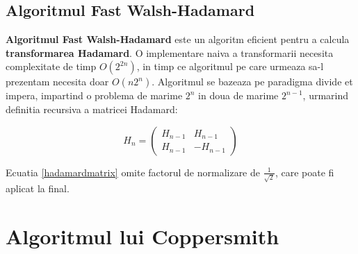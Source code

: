 \subsection{Algoritmul Fast Walsh-Hadamard}

\textbf{Algoritmul Fast Walsh-Hadamard} este un algoritm eficient pentru a
calcula \textbf{transformarea Hadamard}. O implementare naiva a transformarii
necesita complexitate de timp $O(2^{2n})$, in timp ce algoritmul pe care urmeaza
sa-l prezentam necesita doar $O(n2^{n})$. Algoritmul se bazeaza pe paradigma
divide et impera, impartind o problema de marime $2^{n}$ in doua de marime
$2^{n-1}$, urmarind definitia recursiva a matricei Hadamard:

\begin{equation}
  \label{hadamardmatrix}
  H_{n} =
  \begin{pmatrix}
    H_{n-1} & H_{n-1}\\
    H_{n-1} & -H_{n-1}
  \end{pmatrix}
\end{equation}

Ecuatia \ref{hadamardmatrix} omite factorul de normalizare de
$\frac{1}{\sqrt{2}}$, care poate fi aplicat la final.

\begin{algorithm}[H]
  \DontPrintSemicolon
  \;
\end{algorithm}

\begin{algorithm}[H]
  \DontPrintSemicolon
  \;
\end{algorithm}

\pagebreak

\section{Algoritmul lui Coppersmith}

